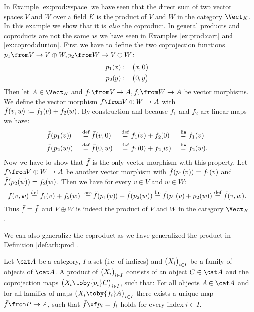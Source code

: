 \begin{example}
  \label{ex:coprod:vspace}
  In Example \ref{ex:prod:vspace} we have seen that the direct sum of two vector spaces $V$ and $W$ over a field $K$ is the product of $V$ and $W$ in the category $\Vect_K$.
  In this example we show that it is \emph{also} the coproduct.
  In general products and coproducts are not the same as we have seen in Examples \ref{ex:prod:cart} and \ref{ex:coprod:dunion}.
  First we have to define the two coprojection functions $p_1 \from V \to V \oplus W, p_2 \from W \to V \oplus W$:
  \begin{alignat*}{2}
    p_1(x) &:= \bigl( x , 0 \bigr) \\
    p_2(y) &:= \bigl( 0 , y \bigr)
  \end{alignat*}
  Then let $A \in \Vect_K$ and $f_1 \from V \to A, f_2 \from W \to A$ be vector morphisms.
  We define the vector morphism $\fbar \from V \oplus W \to A$ with $\bar{f}(v, w) := f_1(v) + f_2(w)$.
  By construction and because $f_1$ and $f_2$ are linear maps we have:
  \begin{alignat*}{6}
    & \bar{f}(p_1(v)) ~&\stackrel{\text{def}}{=}&~ \bar{f}(v, 0) ~&\stackrel{\text{def}}{=}&~ f_1(v) + f_2(0) ~&\stackrel{\text{lin}}{=}&~ f_1(v) \\
    & \bar{f}(p_2(w)) ~&\stackrel{\text{def}}{=}&~ \bar{f}(0, w) ~&\stackrel{\text{def}}{=}&~ f_1(0) + f_2(w) ~&\stackrel{\text{lin}}{=}&~ f_2(w) .
  \end{alignat*}
  Now we have to show that $\bar{f}$ is the only vector morphism with this property.
  Let $\ftilde \from V \oplus W \to A$ be another vector morphism with $\tilde{f}(p_1(v)) = f_1(v)$ and $\tilde{f}(p_2(w)) = f_2(w)$.
  Then we have for every $v \in V$ and $w \in W$:
  $$\bar{f}(v,w) \stackrel{\text{def}}{=} f_1(v) + f_2(w)\ \stackrel{\text{ass}}{=} \tilde{f}(p_1(v)) + \tilde{f}(p_2(w)) \stackrel{\text{lin}}{=} \tilde{f}(p_1(v) + p_2(w)) \stackrel{\text{def}}{=} \tilde{f}(v, w).$$
  Thus $\bar{f} = \tilde{f}$ and $V \oplus W$ is indeed the product of $V$ and $W$ in the category $\Vect_K$.
\end{example}

We can also generalize the coproduct as we have generalized the product in Definition \ref{def:arb:prod}.

\begin{definition}
  \label{def:arb:coprod}
  Let $\catA$ be a category, $I$ a set (i.e. of indices) and $\bigl( X_i \bigr)_{i \in I}$ be a family of objects of $\catA$.
  A product of $\bigl( X_i \bigr)_{i \in I}$ consists of an object $C \in \catA$ and the coprojection maps $\family{X_i \toby{p_i} C}{i \in I}$, such that:
  For all objects $A \in \catA$ and for all families of maps $\family{X_i \toby{f_i} A}{i \in I}$ there exists a unique map $\fbar \from P \to A$, such that $\fbar \of p_i = f_i$ holds for every index $i \in I$.
\end{definition}

